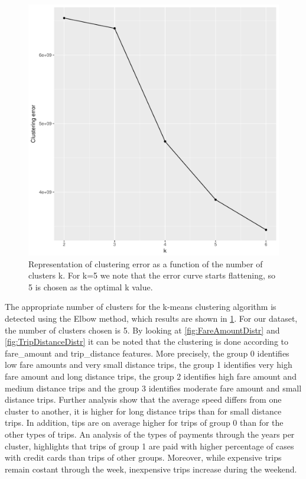 \documentclass{acm_proc_article-sp-sigmod09}
\begin{document}
\begin{figure}
	\centering
	\includegraphics[width=1\columnwidth]{resources/clustered_plots/elbow.pdf}
	\caption{Representation of clustering error as a function of the number of clusters k. For k=5 we note that the error curve starts flattening, so 5 is chosen as the optimal k value.}
	\label{fig:elbow}
\end{figure}

The appropriate number of clusters for the k-means clustering algorithm is detected using the Elbow method, which results are shown in \cref{fig:elbow}. For our dataset, the number of clusters chosen is 5. By looking at \cref{fig:FareAmountDistr} and \cref{fig:TripDistanceDistr} it can be noted that the clustering is done according to fare\_amount and trip\_distance features. More precisely, the group 0 identifies low fare amounts and very small distance trips, the group 1 identifies very high fare amount and long distance trips, the group 2 identifies high fare amount and medium distance trips and the group 3 identifies moderate fare amount and small distance trips. Further analysis show that the average speed differs from one cluster to another, it is higher for long distance trips than for small distance trips. In addition, tips are on average higher for trips of group 0 than for the other types of trips. An analysis of the types of payments through the years per cluster, highlights that trips of group 1 are paid with higher percentage of cases with credit cards than trips of other groups. Moreover, while expensive trips remain costant through the week, inexpensive trips increase during the weekend.
\end{document}
